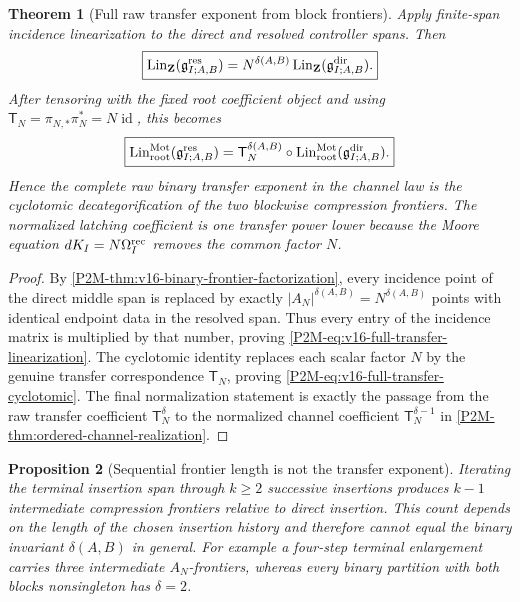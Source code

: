 \documentclass[11pt]{article}
\newtheorem{theorem}{Theorem}[section]
\newtheorem{proposition}[theorem]{Proposition}
\theoremstyle{remark}
\newcommand{\Z}{\mathbf Z}
\newcommand{\Mot}{\mathrm{Mot}}
\newcommand{\rootc}{\mathrm{root}}
\newcommand{\Lin}{\operatorname{Lin}}
\begin{document}
\begin{theorem}[Full raw transfer exponent from block frontiers]
\label{P2M-thm:v16-full-transfer-frontier-readout}
Apply finite-span incidence linearization to the direct and resolved controller
spans.  Then
\begin{equation}\label{P2M-eq:v16-full-transfer-linearization}
 \boxed{
 \Lin_{\Z}(\mathfrak g^{\rm res}_{I;A,B})
 =N^{\delta(A,B)}
  \Lin_{\Z}(\mathfrak g^{\rm dir}_{I;A,B}).}
\end{equation}
After tensoring with the fixed root coefficient object and using
$\mathsf T_N=\pi_{N,*}\pi_N^*=N\operatorname{id}$, this becomes
\begin{equation}\label{P2M-eq:v16-full-transfer-cyclotomic}
 \boxed{
 \Lin_{\rootc}^{\Mot}(\mathfrak g^{\rm res}_{I;A,B})
 =\mathsf T_N^{\delta(A,B)}\circ
  \Lin_{\rootc}^{\Mot}(\mathfrak g^{\rm dir}_{I;A,B}).}
\end{equation}
Hence the complete raw binary transfer exponent in the channel law is the
cyclotomic decategorification of the two blockwise compression frontiers.
The normalized latching coefficient is one transfer power lower because the
Moore equation $dK_I=N\Omega_I^{\rm rec}$ removes the common factor $N$.
\end{theorem}

\begin{proof}
By \cref{P2M-thm:v16-binary-frontier-factorization}, every incidence point of the
direct middle span is replaced by exactly
$|A_N|^{\delta(A,B)}=N^{\delta(A,B)}$ points with identical endpoint data in
the resolved span.  Thus every entry of the incidence matrix is multiplied by
that number, proving \eqref{P2M-eq:v16-full-transfer-linearization}.  The
cyclotomic identity replaces each scalar factor $N$ by the genuine transfer
correspondence $\mathsf T_N$, proving
\eqref{P2M-eq:v16-full-transfer-cyclotomic}.  The final normalization statement is
exactly the passage from the raw transfer coefficient
$\mathsf T_N^{\delta}$ to the normalized channel coefficient
$\mathsf T_N^{\delta-1}$ in \cref{P2M-thm:ordered-channel-realization}.
\end{proof}

\begin{proposition}[Sequential frontier length is not the transfer exponent]
\label{P2M-prop:v16-sequential-not-delta}
Iterating the terminal insertion span through $k\ge2$ successive insertions
produces $k-1$ intermediate compression frontiers relative to direct
insertion.  This count depends on the length of the chosen insertion history
and therefore cannot equal the binary invariant $\delta(A,B)$ in general.
For example a four-step terminal enlargement carries three intermediate
$A_N$-frontiers, whereas every binary partition with both blocks
nonsingleton has $\delta=2$.
\end{proposition}
\end{document}
